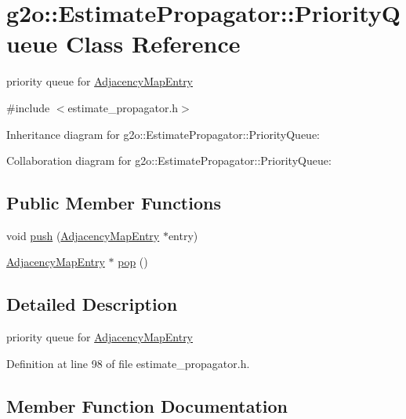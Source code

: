 \hypertarget{classg2o_1_1EstimatePropagator_1_1PriorityQueue}{}\section{g2o\+:\+:Estimate\+Propagator\+:\+:Priority\+Queue Class Reference}
\label{classg2o_1_1EstimatePropagator_1_1PriorityQueue}


priority queue for \hyperlink{classg2o_1_1EstimatePropagator_1_1AdjacencyMapEntry}{Adjacency\+Map\+Entry}  




{\ttfamily \#include $<$estimate\+\_\+propagator.\+h$>$}



Inheritance diagram for g2o\+:\+:Estimate\+Propagator\+:\+:Priority\+Queue\+:


Collaboration diagram for g2o\+:\+:Estimate\+Propagator\+:\+:Priority\+Queue\+:
\subsection*{Public Member Functions}
\begin{DoxyCompactItemize}
\item 
void \hyperlink{classg2o_1_1EstimatePropagator_1_1PriorityQueue_ac89681b92b921412ff432f14028f481e}{push} (\hyperlink{classg2o_1_1EstimatePropagator_1_1AdjacencyMapEntry}{Adjacency\+Map\+Entry} $\ast$entry)
\item 
\hyperlink{classg2o_1_1EstimatePropagator_1_1AdjacencyMapEntry}{Adjacency\+Map\+Entry} $\ast$ \hyperlink{classg2o_1_1EstimatePropagator_1_1PriorityQueue_a82a20f1ebc44dfe305f65ceae7860a85}{pop} ()
\end{DoxyCompactItemize}


\subsection{Detailed Description}
priority queue for \hyperlink{classg2o_1_1EstimatePropagator_1_1AdjacencyMapEntry}{Adjacency\+Map\+Entry} 

Definition at line 98 of file estimate\+\_\+propagator.\+h.



\subsection{Member Function Documentation}
